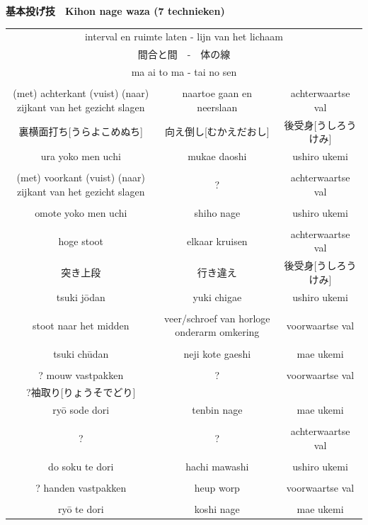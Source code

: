 \documentclass[a4paper, 12pt]{article}
\begin{document}
\begin{CJK}{UTF8}{min}
\newpage
\begin{landscape}
\thispagestyle{empty} %
\begin{center}
    \textbf{基本投げ技　Kihon nage waza (7 technieken)}
\end{center}
\begin{table}[H]
\begin{center}
\scriptsize
\begin{tabular}{ccc}
\multicolumn{3}{c}{interval en ruimte laten - lijn van het lichaam}\\
\multicolumn{3}{c}{間合と間　-　体の線}\\
\multicolumn{3}{c}{ma ai to ma - tai no sen}\\
\\
(met) achterkant (vuist) (naar) zijkant van het gezicht slagen & naartoe gaan en neerslaan & achterwaartse val\\
裏横面打ち[うらよこめぬち] & 向え倒し[むかえだおし] & 後受身[うしろうけみ]\\
ura yoko men uchi & mukae daoshi & ushiro ukemi\\
\\
(met) voorkant (vuist) (naar) zijkant van het gezicht slagen & ? & achterwaartse val\\
\\
omote yoko men uchi & shiho nage & ushiro ukemi\\
\\
hoge stoot & elkaar kruisen & achterwaartse val\\
突き上段 & 行き違え & 後受身[うしろうけみ]\\
tsuki j\={o}dan & yuki chigae & ushiro ukemi\\
\\
stoot naar het midden & veer/schroef van horloge onderarm omkering & voorwaartse val\\
\\
tsuki ch\={u}dan & neji kote gaeshi & mae ukemi\\
\\
? mouw vastpakken & ? & voorwaartse val\\
?袖取り[りょうそでどり]  &   &   \\
ry\={o} sode dori & tenbin nage & mae ukemi\\
\\
? & ? & achterwaartse val\\
\\
do soku te dori & hachi mawashi & ushiro ukemi\\
\\
? handen vastpakken & heup worp & voorwaartse val\\
\\
ry\={o} te dori & koshi nage & mae ukemi
\end{tabular}
\end{center}
\label{kihonnagewaza}
\end{table}
\end{landscape}


\end{CJK}
\end{document}
